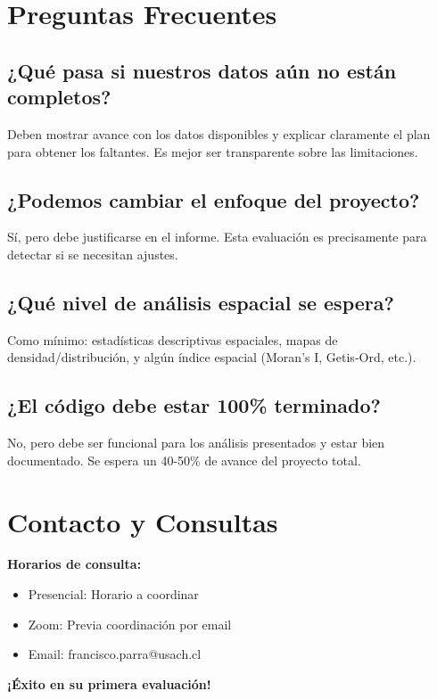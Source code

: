 \documentclass[11pt,letterpaper]{article}
\begin{document}
\section{Preguntas Frecuentes}

\subsection{¿Qué pasa si nuestros datos aún no están completos?}
Deben mostrar avance con los datos disponibles y explicar claramente el plan para obtener los faltantes. Es mejor ser transparente sobre las limitaciones.

\subsection{¿Podemos cambiar el enfoque del proyecto?}
Sí, pero debe justificarse en el informe. Esta evaluación es precisamente para detectar si se necesitan ajustes.

\subsection{¿Qué nivel de análisis espacial se espera?}
Como mínimo: estadísticas descriptivas espaciales, mapas de densidad/distribución, y algún índice espacial (Moran's I, Getis-Ord, etc.).

\subsection{¿El código debe estar 100\% terminado?}
No, pero debe ser funcional para los análisis presentados y estar bien documentado. Se espera un 40-50\% de avance del proyecto total.

\section{Contacto y Consultas}

\begin{tcolorbox}[colback=infoblue!20, colframe=infoblue!80]
\textbf{Horarios de consulta:}
\begin{itemize}
    \item Presencial: Horario a coordinar
    \item Zoom: Previa coordinación por email
    \item Email: francisco.parra@usach.cl
\end{itemize}
\end{tcolorbox}

\vspace{1cm}

\begin{center}
\large{\textbf{¡Éxito en su primera evaluación!}}
\end{center}
\end{document}
